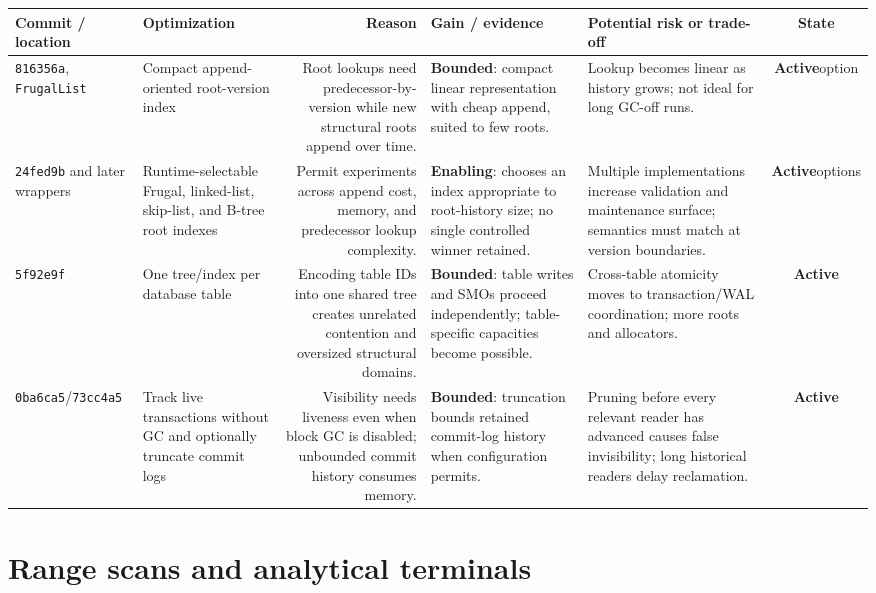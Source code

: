 \documentclass[10pt,a4paper,landscape]{article}
\newcommand{\code}[1]{\texttt{#1}}
\newcommand{\commit}[1]{\code{#1}}
\newcommand{\gainbounded}{\textbf{Bounded}}
\newcommand{\gainenabling}{\textbf{Enabling}}
\newcommand{\stateactive}{\textbf{Active}}
\begin{document}
\begin{longtable}{IORGKS}
\toprule
\textbf{Commit / location} & \textbf{Optimization} & \textbf{Reason} &
\textbf{Gain / evidence} & \textbf{Potential risk or trade-off} & \textbf{State} \\
\midrule
\endhead
\commit{816356a}, \code{FrugalList} & Compact append-oriented root-version index & Root
lookups need predecessor-by-version while new structural roots append over time. &
\gainbounded: compact linear representation with cheap append, suited to few roots. & Lookup
becomes linear as history grows; not ideal for long GC-off runs. & \stateactive option \\

\commit{24fed9b} and later wrappers & Runtime-selectable Frugal, linked-list, skip-list,
and B-tree root indexes & Permit experiments across append cost, memory, and predecessor
lookup complexity. & \gainenabling: chooses an index appropriate to root-history size; no
single controlled winner retained. & Multiple implementations increase validation and
maintenance surface; semantics must match at version boundaries. & \stateactive options \\

\commit{5f92e9f} & One tree/index per database table & Encoding table IDs into one shared
tree creates unrelated contention and oversized structural domains. & \gainbounded: table
writes and SMOs proceed independently; table-specific capacities become possible. &
Cross-table atomicity moves to transaction/WAL coordination; more roots and allocators. &
\stateactive \\

\commit{0ba6ca5}/\commit{73cc4a5} & Track live transactions without GC and optionally
truncate commit logs & Visibility needs liveness even when block GC is disabled; unbounded
commit history consumes memory. & \gainbounded: truncation bounds retained commit-log history
when configuration permits. & Pruning before every relevant reader has advanced causes
false invisibility; long historical readers delay reclamation. & \stateactive \\
\bottomrule
\end{longtable}

\section{Range scans and analytical terminals}
\end{document}
